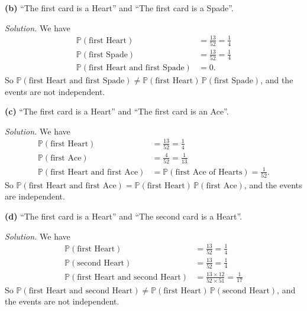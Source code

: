 \documentclass[
  a4paper,
]{book}
\theoremstyle{definition}
\theoremstyle{definition}
\theoremstyle{definition}
\theoremstyle{definition}
\theoremstyle{remark}
\begin{document}
\textbf{(b)} ``The first card is a Heart'' and ``The first card is a Spade''.

\begin{myanswers}
\emph{Solution.}
We have
\begin{align*}
\mathbb P(\text{first Heart}) &= \frac{13}{52} = \frac14 \\
\mathbb P(\text{first Spade}) &= \frac{13}{52} = \frac14 \\
\mathbb P(\text{first Heart and first Spade}) &= 0 .
\end{align*}
So \(\mathbb P(\text{first Heart and first Spade}) \neq \mathbb P(\text{first Heart})\,\mathbb P(\text{first Spade})\), and the events are not independent.

\end{myanswers}

\textbf{(c)} ``The first card is a Heart'' and ``The first card is an Ace''.

\begin{myanswers}
\emph{Solution.}
We have
\begin{align*}
\mathbb P(\text{first Heart}) &= \frac{13}{52} = \frac14 \\
\mathbb P(\text{first Ace}) &= \frac{4}{52} = \frac1{13} \\
\mathbb P(\text{first Heart and first Ace}) &= \mathbb P(\text{first Ace of Hearts}) = \frac1{52} .
\end{align*}
So \(\mathbb P(\text{first Heart and first Ace}) = \mathbb P(\text{first Heart})\,\mathbb P(\text{first Ace})\), and the events are independent.

\end{myanswers}

\textbf{(d)} ``The first card is a Heart'' and ``The second card is a Heart''.

\begin{myanswers}
\emph{Solution.}
We have
\begin{align*}
\mathbb P(\text{first Heart}) &= \frac{13}{52} = \frac14 \\
\mathbb P(\text{second Heart}) &= \frac{13}{52} = \frac14 \\
\mathbb P(\text{first Heart and second Heart}) &= \frac{13\times 12}{52 \times 51} = \frac{1}{17}
\end{align*}
So \(\mathbb P(\text{first Heart and second Heart}) \neq \mathbb P(\text{first Heart})\,\mathbb P(\text{second Heart})\), and the events are not independent.

\end{myanswers}
\end{document}
